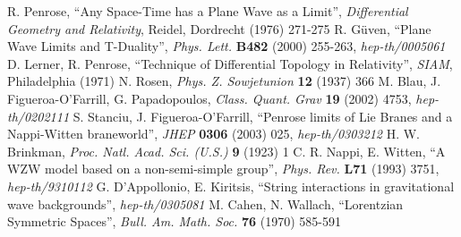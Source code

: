 \documentclass[11pt, a4paper, titlepage]{article}
\begin{document}
\begin{thebibliography}{100}
 R. Penrose, ``Any Space-Time has a Plane Wave as a Limit'',
  \textit{Differential Geometry and Relativity}, Reidel, Dordrecht (1976)
  271-275
 R. G\"{u}ven, ``Plane Wave Limits and T-Duality'', \textit{Phys.
    Lett.} \textbf{B482} (2000) 255-263, \textit{hep-th/0005061}
 D. Lerner, R. Penrose, ``Technique of Differential Topology in
  Relativity'', \textit{SIAM}, Philadelphia (1971)
 N. Rosen, \textit{Phys. Z. Sowjetunion} \textbf{12} (1937) 366
 M. Blau, J. Figueroa-O'Farrill, G. Papadopoulos, \textit{Class.
    Quant. Grav} \textbf{19} (2002) 4753, \textit{hep-th/0202111}
 S. Stanciu, J. Figueroa-O'Farrill, ``Penrose limits of Lie
  Branes and a Nappi-Witten braneworld'', \textit{JHEP} \textbf{0306} (2003)
  025, \textit{hep-th/0303212}
 H. W. Brinkman, \textit{Proc. Natl. Acad. Sci. (U.S.)}
  \textbf{9} (1923) 1
 C. R. Nappi, E. Witten, ``A WZW model based on a non-semi-simple
  group'', \textit{Phys. Rev.} \textbf{L71} (1993) 3751, \textit{hep-th/9310112}
 G. D'Appollonio, E. Kiritsis, ``String interactions in
  gravitational wave backgrounds'', \textit{hep-th/0305081}
 M. Cahen, N. Wallach, ``Lorentzian Symmetric Spaces'',
  \textit{Bull. Am. Math. Soc.} \textbf{76} (1970) 585-591
\end{thebibliography}
\end{document}
